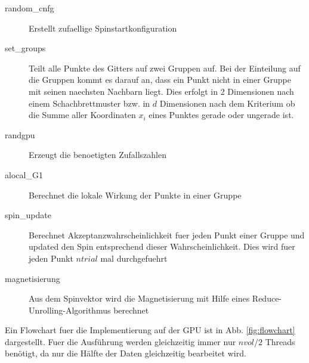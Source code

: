 \documentclass[10pt,a4paper]{article}
\begin{document}
\begin{description}
\item [random\_cnfg]  Erstellt zufaellige Spinstartkonfiguration
\item [set\_groups] Teilt alle Punkte des Gitters auf zwei Gruppen auf. Bei der Einteilung auf die Gruppen kommt es darauf an, dass
		    ein Punkt nicht in einer Gruppe mit seinen naechsten Nachbarn liegt.
		    Dies erfolgt in 2 Dimensionen nach einem Schachbrettmuster
		    bzw. in $d$ Dimensionen nach dem Kriterium ob die Summe aller Koordinaten $x_i$ eines Punktes gerade oder ungerade ist.
\item [randgpu] Erzeugt die benoetigten Zufallszahlen
\item [alocal\_G1] Berechnet die lokale Wirkung der Punkte in einer Gruppe
\item [spin\_update] Berechnet Akzeptanzwahrscheinlichkeit fuer jeden Punkt einer Gruppe und updated den Spin entsprechend
dieser Wahrscheinlichkeit. Dies wird fuer jeden Punkt $ntrial$ mal durchgefuehrt
\item [magnetisierung] Aus dem Spinvektor wird die Magnetisierung mit Hilfe eines Reduce-Unrolling-Algorithmus berechnet
\end{description}
Ein Flowchart fuer die Implementierung auf der GPU ist in Abb. \ref{fig:flowchart} dargestellt.
Fuer die Ausführung werden gleichzeitig immer nur $nvol/2$ Threads benötigt, da nur die Hälfte der Daten gleichzeitig bearbeitet wird.
\end{document}
